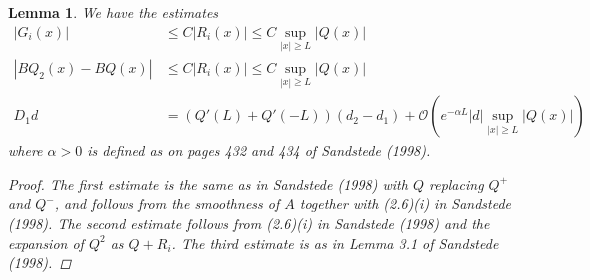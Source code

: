 \documentclass[12pt]{article}
\newtheorem{lemma}{Lemma}
\begin{document}
\begin{lemma}We have the estimates
\begin{align*}
|G_i(x)| &\leq C|R_i(x)| \leq C \sup_{|x| \geq L} |Q(x)| \\
| B Q_2(x) - B Q(x) | & \leq C |R_i(x)| \leq C \sup_{|x| \geq L} |Q(x)| \\
D_1 d &= (Q'(L) + Q'(-L))(d_2 - d_1) +\mathcal{O}\left( e^{-\alpha L} |d| \sup_{|x| \geq L} |Q(x)| \right)
\end{align*}
where $\alpha > 0$ is defined as on pages 432 and 434 of Sandstede (1998).
\begin{proof}
The first estimate is the same as in Sandstede (1998) with $Q$ replacing $Q^+$ and $Q^-$, and follows from the smoothness of $A$ together with (2.6)(i) in Sandstede (1998). The second estimate follows from (2.6)(i) in Sandstede (1998) and the expansion of $Q^2$ as $Q + R_i$. The third estimate is as in Lemma 3.1 of Sandstede (1998).
\end{proof}
\end{lemma}
\end{document}
